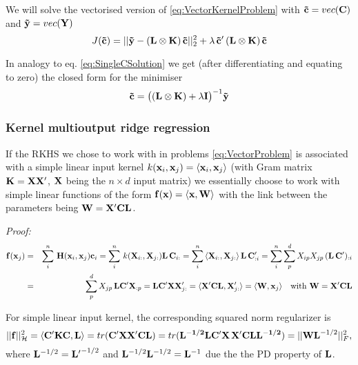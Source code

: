 We will solve the vectorised version of \eqref{eq:VectorKernelProblem} with $\mathbf{\tilde{c}} =
vec(\mathbf{C})$ and $\mathbf{\tilde{y}} = vec(\mathbf{Y})$
\begin{equation}\label{eq:VecKernelProblem}
 J(\mathbf{\tilde{c}}) = || \mathbf{\tilde{y}} - (\mathbf{L} \otimes \mathbf{K}) \, \mathbf{\tilde{c}} ||_2^2 + \lambda \,
\mathbf{\tilde{c}}' \, (\mathbf{L} \otimes \mathbf{K}) \, \mathbf{\tilde{c}}
\end{equation}

In analogy to eq. \eqref{eq:SingleCSolution} we get (after differentiating and equating to zero) the closed form for the minimiser
\begin{equation}\label{eq:VectorCSolution}
 \mathbf{\tilde{c}} = \big( (\mathbf{L} \otimes \mathbf{K}) + \lambda \mathbf{I} \big)^{-1} \mathbf{\tilde{y}}
\end{equation} 

\subsubsection{Kernel multioutput ridge regression}\label{sec:VectorRidge}

If the RKHS we chose to work with in problems \eqref{eq:VectorProblem} is associated with
a simple linear input kernel $k(\mathbf{x}_i,\mathbf{x}_j) = \langle \mathbf{x}_i,\mathbf{x}_j \rangle$ (with
Gram matrix $\mathbf{K} = \mathbf{XX'}$, $\mathbf{X}$ being the $n \times d$ input matrix) 
we essentially choose to work with simple linear functions of the form 
$\mathbf{f}(\mathbf{x}) = \langle \mathbf{x} , \mathbf{W} \rangle$ with the link between the parameters being $\mathbf{W} = \mathbf{X'CL}$.

\begin{small}
\emph{Proof:}
\begin{eqnarray*}
\mathbf{f}(\mathbf{x}_j) & = & \sum_i^n \, \mathbf{H}(\mathbf{x}_i,\mathbf{x}_j) \mathbf{c}_i 
= \sum_i^n \, k(\mathbf{X}_{i:},\mathbf{X}_{j:}) \mathbf{L} \, \mathbf{C}_{i:} 
= \sum_i^n \, \langle \mathbf{X}_{i:},\mathbf{X}_{j:} \rangle \, \mathbf{L} \, \mathbf{C}'_{:i} 
= \sum_i^n \sum_p^d X_{ip} X_{jp} \, (\mathbf{L} \, \mathbf{C}')_{:i} \\
& = & \sum_p^d X_{jp} \, \mathbf{LC'} \mathbf{X}_{:p} = \mathbf{L C'X} \mathbf{X}'_{j:} 
 =  \langle \mathbf{X' C L}, \mathbf{X}'_{j:} \rangle = \langle \mathbf{W}, \mathbf{x}_j  \rangle
\quad \text{with } \mathbf{W} = \mathbf{X'CL}
\end{eqnarray*}
\end{small}

For simple linear input kernel, the corresponding squared norm regularizer is 
\begin{equation}
 ||\mathbf{f}||_\mathcal{H}^2 = \langle \mathbf{C'KC,L} \rangle = tr(\mathbf{C'XX'CL}) = tr(\mathbf{L^{-1/2}LC'X\,X'CLL^{-1/2}}) = ||\mathbf{WL}^{-1/2}||_F^2, 
\end{equation}
where $\mathbf{L}^{-1/2} = \mathbf{L'}^{-1/2}$ and $\mathbf{L}^{-1/2} \mathbf{L}^{-1/2} = \mathbf{L}^{-1}$ due the the PD property of $\mathbf{L}$.

